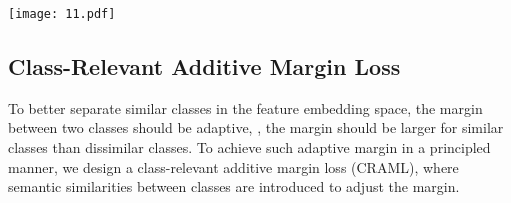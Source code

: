 \documentclass[10pt,twocolumn,letterpaper]{article}
\begin{document}
\begin{figure*}[t]
\begin{center}
\texttt{[image: 11.pdf]}
\end{center} \caption{The overview of the proposed approach. Our approach consists of two stages: 1) In each episode of the meta-training stage,  we first sample a meta-training task from the base class dataset. Then, the names of classes in the meta-training task are fed into a word embedding model to extract semantic vectors for classes. After that, we propose an adaptive margin generator to produce margin penalty for each pair of classes (\eg, the class relevant margin generator proposed in Section \ref{sect:class_aware} or the task relevant margin generator proposed in Section \ref{sect:task_relevant}). Finally, we integrate the margin penalty into the classification loss and thus obtain an adaptive margin loss. A meta-learner consisting of an embedding module and a metric module is trained by minimizing the adaptive margin loss. 2) In the meta-testing stage, with the embedding module and metric module learned in the meta-training stage, we use a simple softmax (without any margin) to predict the labels of test novel samples. }
\label{overview}
\end{figure*}

\subsection{Class-Relevant Additive Margin Loss}
\label{sect:class_aware}

To better separate similar classes in the feature embedding space, the margin between two classes should be adaptive, \ie, the margin should be larger for similar classes than dissimilar classes. To achieve such adaptive margin in a principled manner, we design a class-relevant additive margin loss (CRAML), where semantic similarities between classes are introduced to adjust the margin. 
\end{document}
